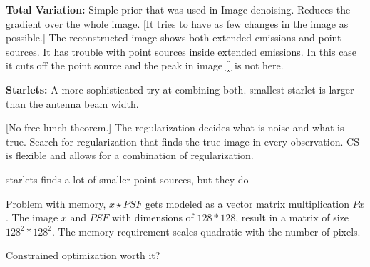 \textbf{Total Variation:} Simple prior that was used in Image denoising. Reduces the gradient over the whole image. [It tries to have as few changes in the image as possible.] The reconstructed image shows both extended emissions and point sources. It has trouble with point sources inside extended emissions. In this case it cuts off the point source and the peak in image \ref{} is not here.

\textbf{Starlets:} A more sophisticated try at combining both. smallest starlet is larger than the antenna beam width.

[No free lunch theorem.] The regularization decides what is noise and what is true. Search for regularization that finds the true image in every observation. CS is flexible and allows for a combination of regularization.

starlets finds a lot of smaller point sources, but they do

Problem with memory, $x \star PSF$ gets modeled as a vector matrix multiplication $Px$. The image $x$ and $PSF$ with dimensions of $128 * 128$, result in a matrix of size $128^2 * 128^2$. The memory requirement scales quadratic with the number of pixels. 

Constrained optimization worth it?
